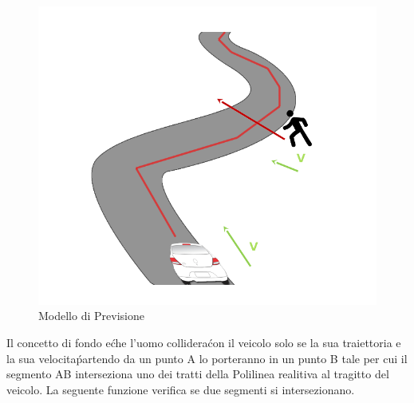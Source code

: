 \documentclass[conference]{IEEEtran}
\begin{document}
 
\begin{figure}[h!]
	\centering
	\includegraphics[width=0.7\linewidth]{prevmod}
	\caption{Modello di Previsione}
	\label{fig:prevmod}
\end{figure}
 
Il concetto di fondo e\' che l'uomo collidera\' con il veicolo solo se la sua traiettoria e la sua velocita\' partendo da un punto A lo porteranno in un punto B tale per cui il segmento AB interseziona uno dei tratti della Polilinea realitiva al tragitto del veicolo.
La seguente funzione verifica se due segmenti si intersezionano.
\end{document}

